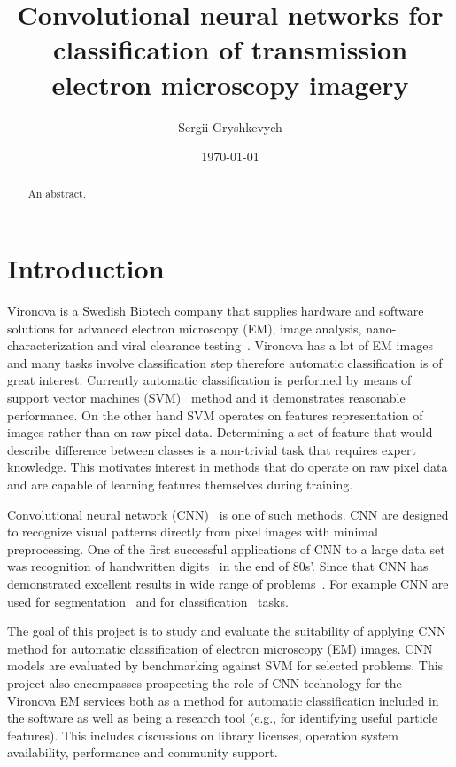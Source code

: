 \documentclass[a4paper, 11pt, table]{article}
\title{Convolutional neural networks for classification of transmission electron microscopy imagery}
\author{Sergii Gryshkevych}
\date{\today}
\begin{document}
\maketitle

\tableofcontents

\begin{abstract}
An abstract.
\end{abstract}

\section{Introduction}
Vironova is a Swedish Biotech company that supplies hardware and software solutions for advanced electron microscopy (EM), image analysis, nano-characterization and viral clearance testing~\cite{virnonva_linkedin}. Vironova has a lot of EM images and many tasks involve classification step therefore automatic classification is of great interest. Currently automatic classification is performed by means of support vector machines (SVM)~\cite{Boser:1992:TAO:130385.130401} method and it demonstrates reasonable performance. On the other hand SVM operates on features representation of images rather than on raw pixel data. Determining a set of feature that would describe difference between classes is a non-trivial task that requires expert knowledge. This motivates interest in methods that do operate on raw pixel data and are capable of learning features themselves during training. 

Convolutional neural network (CNN)~\cite{LeCun1986} is one of such methods. CNN are designed to recognize visual patterns directly from pixel images with minimal preprocessing. One of the first successful applications of CNN to a large data set was recognition of handwritten digits~\cite{41400} in the end of 80s'. Since that CNN has demonstrated excellent results in wide range of problems~\cite{NIPS2012_4824, DBLP:journals/corr/LinCY13}. For example CNN are used for segmentation~\cite{DBLP:journals/corr/ShelhamerLD16, Ronneberger2015} and for classification~\cite{NIPS2012_4824, DBLP:journals/corr/abs-1202-2745} tasks.

The goal of this project is to study and evaluate the suitability of applying CNN method for automatic classification of electron microscopy (EM) images. CNN models are evaluated by benchmarking against SVM for selected problems. This project also encompasses prospecting the role of CNN technology for the Vironova EM services both as a method for automatic classification included in the software as well as being a research tool (e.g., for identifying useful particle features). This includes discussions on library licenses, operation system availability, performance and community support.
\end{document}
